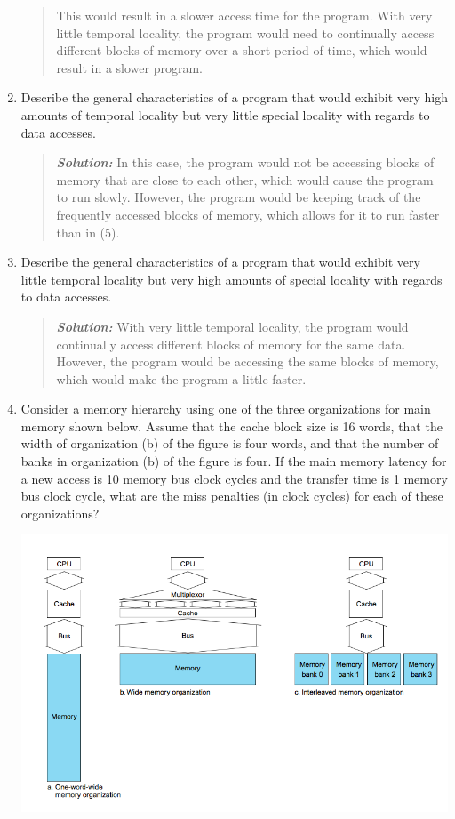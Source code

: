 \documentclass{article}
\newcommand{\SLN}{\textit{\textbf{Solution: }}}
\begin{document}
\begin{enumerate}
\begin{quote}
This would result in a slower access time for the program. 
With very little temporal locality, the program would need to continually access different blocks of memory over a short
period of time, which would result in a slower program.
\end{quote}
\item Describe the general characteristics of a program that would exhibit very high amounts of temporal locality 
but very little special locality with regards to data accesses.
\begin{quote}
\indent \SLN In this case, the program would not be accessing blocks of memory that are close to each other,
which would cause the program to run slowly. However, the program would be keeping track of the frequently
accessed blocks of memory, which allows for it to run faster than in (5). 
\end{quote}
\item Describe the general characteristics of a program that would exhibit very little temporal locality
but very high amounts of special locality with regards to data accesses.
\begin{quote}
\indent \SLN With very little temporal locality, the program would continually access different blocks of memory
for the same data. 
However, the program would be accessing the same blocks of memory, which would make the program a little faster.
\end{quote}
\item 
Consider a memory hierarchy using one of the three organizations for main memory shown below. 
Assume that the cache block size is 16 words, that the width of organization (b) of the figure is four words, 
and that the number of banks in organization (b) of the figure is four. 
If the main memory latency for a new access is 10 memory bus clock cycles and the transfer time is 1 memory bus clock cycle, 
what are the miss penalties (in clock cycles) for each of these organizations?
\begin{center}
\includegraphics[scale=0.5]{hw5_graphic2}

\end{center}
\end{enumerate}
\end{document}
